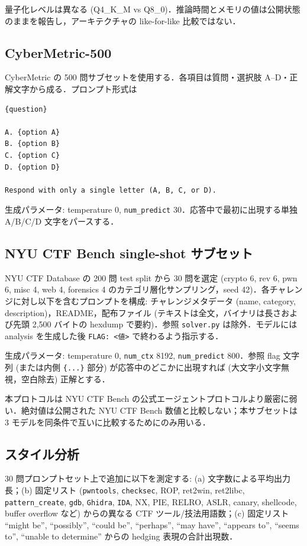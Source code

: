 \documentclass[10pt,twocolumn,a4paper]{ltjsarticle}
\begin{document}
量子化レベルは異なる (Q4{\_}K{\_}M vs Q8{\_}0)．推論時間とメモリの値は公開状態のままを報告し，アーキテクチャの like-for-like 比較ではない．

\subsection{CyberMetric-500}

CyberMetric \cite{tihanyi2024cybermetric} の 500 問サブセットを使用する．各項目は質問・選択肢 A--D・正解文字から成る．プロンプト形式は

\begin{lstlisting}
{question}

A. {option A}
B. {option B}
C. {option C}
D. {option D}

Respond with only a single letter (A, B, C, or D).
\end{lstlisting}

生成パラメータ: temperature 0, \texttt{num\_predict} 30．応答中で最初に出現する単独 A/B/C/D 文字をパースする．

\subsection{NYU CTF Bench single-shot サブセット}

NYU CTF Database \cite{shao2024nyuctf} の 200 問 test split から 30 問を選定 (crypto 6, rev 6, pwn 6, misc 4, web 4, forensics 4 のカテゴリ層化サンプリング，seed 42)．各チャレンジに対し以下を含むプロンプトを構成: チャレンジメタデータ (name, category, description)，README，配布ファイル (テキストは全文，バイナリは長さおよび先頭 2{,}500 バイトの hexdump で要約)．参照 \texttt{solver.py} は除外．モデルには analysis を生成した後 \texttt{FLAG: <値>} で終わるよう指示する．

生成パラメータ: temperature 0, \texttt{num\_ctx} 8192, \texttt{num\_predict} 800．参照 flag 文字列 (または内側 \texttt{\{...\}} 部分) が応答中のどこかに出現すれば (大文字小文字無視，空白除去) 正解とする．

本プロトコルは NYU CTF Bench の公式エージェントプロトコルより厳密に弱い．絶対値は公開された NYU CTF Bench 数値と比較しない；本サブセットは 3 モデルを同条件で互いに比較するためにのみ用いる．

\subsection{スタイル分析}

30 問プロンプトセット上で追加に以下を測定する: (a) 文字数による平均出力長；(b) 固定リスト (\texttt{pwntools}, \texttt{checksec}, ROP, ret2win, ret2libc, \texttt{pattern\_create}, \texttt{gdb}, \texttt{Ghidra}, \texttt{IDA}, NX, PIE, RELRO, ASLR, canary, shellcode, buffer overflow など) からの異なる CTF ツール/技法用語数；(c) 固定リスト ``might be'', ``possibly'', ``could be'', ``perhaps'', ``may have'', ``appears to'', ``seems to'', ``unable to determine'' からの hedging 表現の合計出現数．
\end{document}

